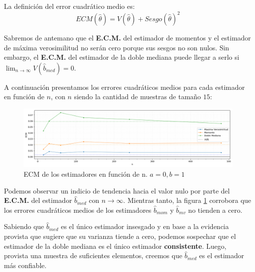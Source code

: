 La definición del error cuadrático medio es:
\begin{displaymath}
	ECM(\hat{\theta}) = V(\hat{\theta}) + Sesgo(\hat{\theta})^2
\end{displaymath}

Sabremos de antemano que el \textbf{E.C.M.} del estimador de momentos y el estimador de máxima verosimilitud no serán cero porque sus sesgos no son nulos. Sin embargo, el \textbf{E.C.M.} del estimador de la doble mediana puede llegar a serlo si $\lim_{n \to \infty} V(\hat{b}_{med}) = 0$.

\vskip 8pt

A continuación presentamos los errores cuadráticos medios para cada estimador en función de $n$, con $n$ siendo la cantidad de muestras de tamaño $15$:

\begin{figure}[H]
	\centering
	\includegraphics[width=1\textwidth]{imagenes/ecm-en-f-de-n.png}
	\caption{\footnotesize ECM de los estimadores en función de n. $a=0, b=1$}
	\label{fig:ej7-ecm-en-f-de-n}
\end{figure}

Podemos observar un indicio de tendencia hacia el valor nulo por parte del \textbf{E.C.M.} del estimador $\hat{b}_{med}$ con $n \to \infty$. Mientras tanto, la figura \ref{fig:ej7-ecm-en-f-de-n} corrobora que los errores cuadráticos medios de los estimadores $\hat{b}_{mom}$ y $\hat{b}_{mv}$ no tienden a cero.

\vskip 8pt

Sabiendo que $\hat{b}_{med}$ es el único estimador insesgado y en base a la evidencia provista que sugiere que su varianza tiende a cero, podemos sospechar que el estimador de la doble mediana es el único estimador \textbf{consistente}. Luego, provista una muestra de suficientes elementos, creemos que $\hat{b}_{med}$ es el estimador más confiable.